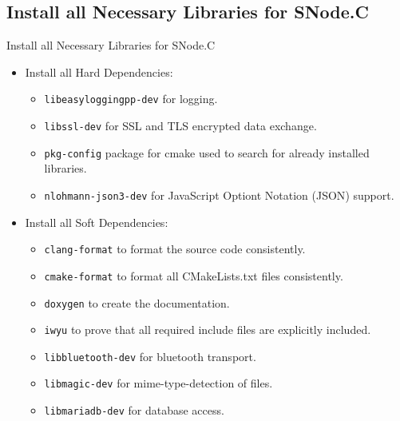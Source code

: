 \subsection{Install all Necessary Libraries for SNode.C}

\begin{frame}{Install all Necessary Libraries for SNode.C}
  \begin{itemize}
    \item Install all \textcolor{fh-ooe-red}{Hard Dependencies}:
    \begin{itemize}
      \item \texttt{\textcolor{fh-ooe-red}{libeasyloggingpp-dev}} for logging.
      \item \texttt{\textcolor{fh-ooe-red}{libssl-dev}} for SSL and TLS encrypted data exchange.
      \item \texttt{\textcolor{fh-ooe-red}{pkg-config}} package for cmake used to search for already installed libraries.
      \item \texttt{\textcolor{fh-ooe-red}{nlohmann-json3-dev}} for \textcolor{fh-ooe-red}{J}ava\textcolor{fh-ooe-red}{S}cript \textcolor{fh-ooe-red}{O}ptiont \textcolor{fh-ooe-red}{N}otation (\textcolor{fh-ooe-red}{JSON}) support.
    \end{itemize}
    \item Install all \textcolor{fh-ooe-red}{Soft Dependencies}:
    \begin{itemize}
      \item \texttt{\textcolor{fh-ooe-red}{clang-format}} to format the source code consistently.
      \item \texttt{\textcolor{fh-ooe-red}{cmake-format}} to format all CMakeLists.txt files consistently.
      \item \texttt{\textcolor{fh-ooe-red}{doxygen}} to create the documentation.
      \item \texttt{\textcolor{fh-ooe-red}{iwyu}} to prove that all required include files are explicitly included.
      \item \texttt{\textcolor{fh-ooe-red}{libbluetooth-dev}} for bluetooth transport.
      \item \texttt{\textcolor{fh-ooe-red}{libmagic-dev}} for mime-type-detection of files.
      \item \texttt{\textcolor{fh-ooe-red}{libmariadb-dev}} for database access.
    \end{itemize}
  \end{itemize}
\end{frame}

